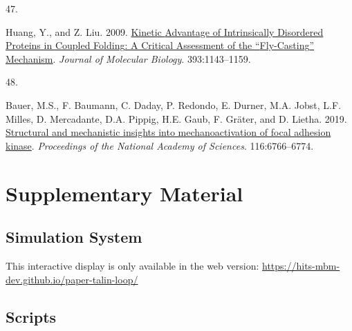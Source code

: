 \documentclass[
  twocolumn]{biophys-new-mod}
\newlength{\cslhangindent}
\newlength{\csllabelwidth}
\newlength{\cslentryspacingunit} %
\newenvironment{CSLReferences}[2] %
 {%
  \setlength{\parindent}{0pt}
  \ifodd #1
  \let\oldpar\par
  \def\par{\hangindent=\cslhangindent\oldpar}
  \fi
  \setlength{\parskip}{#2\cslentryspacingunit}
 }%
 {}
\newcommand{\CSLLeftMargin}[1]{\parbox[t]{\csllabelwidth}{#1}}
\newcommand{\CSLRightInline}[1]{\parbox[t]{\linewidth - \csllabelwidth}{#1}\break}
\begin{document}
\begin{CSLReferences}{0}{0}
\leavevmode{}%
\CSLLeftMargin{47. }%
\CSLRightInline{Huang, Y., and Z. Liu. 2009.
\href{https://doi.org/10.1016/j.jmb.2009.09.010}{Kinetic {Advantage} of
{Intrinsically Disordered Proteins} in {Coupled
Folding}\textendash{{Binding Process}}: {A Critical Assessment} of the
{``{Fly-Casting}''} {Mechanism}}. \emph{Journal of Molecular Biology}.
393:1143--1159.}

\leavevmode{}%
\CSLLeftMargin{48. }%
\CSLRightInline{Bauer, M.S., F. Baumann, C. Daday, P. Redondo, E.
Durner, M.A. Jobst, L.F. Milles, D. Mercadante, D.A. Pippig, H.E. Gaub,
F. Gräter, and D. Lietha. 2019.
\href{https://doi.org/10.1073/pnas.1820567116}{Structural and
mechanistic insights into mechanoactivation of focal adhesion kinase}.
\emph{Proceedings of the National Academy of Sciences}. 116:6766--6774.}

\end{CSLReferences}

\hypertarget{supplementary-material}{%
\section{Supplementary Material}\label{supplementary-material}}

\hypertarget{sec-system}{%
\subsection{Simulation System}\label{sec-system}}

\begin{tcolorbox}[enhanced jigsaw, title=\textcolor{quarto-callout-note-color}{\faInfo}\hspace{0.5em}{Note}, colback=white, titlerule=0mm, leftrule=.75mm, bottomrule=.15mm, coltitle=black, colbacktitle=quarto-callout-note-color!10!white, breakable, left=2mm, opacityback=0, arc=.35mm, toprule=.15mm, opacitybacktitle=0.6, rightrule=.15mm, bottomtitle=1mm, toptitle=1mm, colframe=quarto-callout-note-color-frame]
This interactive display is only available in the web version:
\url{https://hits-mbm-dev.github.io/paper-talin-loop/}
\end{tcolorbox}

\hypertarget{scripts}{%
\subsection{Scripts}\label{scripts}}
\end{document}
